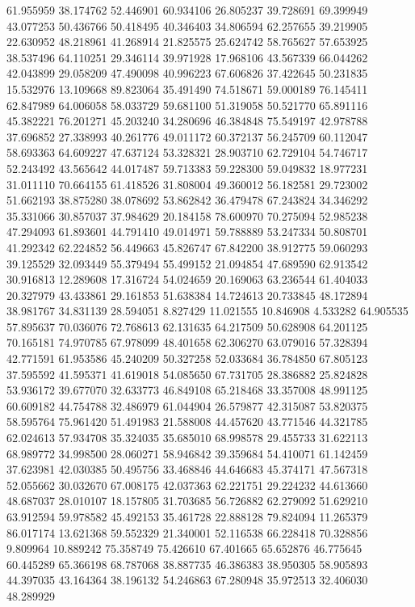61.955959
38.174762
52.446901
60.934106
26.805237
39.728691
69.399949
43.077253
50.436766
50.418495
40.346403
34.806594
62.257655
39.219905
22.630952
48.218961
41.268914
21.825575
25.624742
58.765627
57.653925
38.537496
64.110251
29.346114
39.971928
17.968106
43.567339
66.044262
42.043899
29.058209
47.490098
40.996223
67.606826
37.422645
50.231835
15.532976
13.109668
89.823064
35.491490
74.518671
59.000189
76.145411
62.847989
64.006058
58.033729
59.681100
51.319058
50.521770
65.891116
45.382221
76.201271
45.203240
34.280696
46.384848
75.549197
42.978788
37.696852
27.338993
40.261776
49.011172
60.372137
56.245709
60.112047
58.693363
64.609227
47.637124
53.328321
28.903710
62.729104
54.746717
52.243492
43.565642
44.017487
59.713383
59.228300
59.049832
18.977231
31.011110
70.664155
61.418526
31.808004
49.360012
56.182581
29.723002
51.662193
38.875280
38.078692
53.862842
36.479478
67.243824
34.346292
35.331066
30.857037
37.984629
20.184158
78.600970
70.275094
52.985238
47.294093
61.893601
44.791410
49.014971
59.788889
53.247334
50.808701
41.292342
62.224852
56.449663
45.826747
67.842200
38.912775
59.060293
39.125529
32.093449
55.379494
55.499152
21.094854
47.689590
62.913542
30.916813
12.289608
17.316724
54.024659
20.169063
63.236544
61.404033
20.327979
43.433861
29.161853
51.638384
14.724613
20.733845
48.172894
38.981767
34.831139
28.594051
8.827429
11.021555
10.846908
4.533282
64.905535
57.895637
70.036076
72.768613
62.131635
64.217509
50.628908
64.201125
70.165181
74.970785
67.978099
48.401658
62.306270
63.079016
57.328394
42.771591
61.953586
45.240209
50.327258
52.033684
36.784850
67.805123
37.595592
41.595371
41.619018
54.085650
67.731705
28.386882
25.824828
53.936172
39.677070
32.633773
46.849108
65.218468
33.357008
48.991125
60.609182
44.754788
32.486979
61.044904
26.579877
42.315087
53.820375
58.595764
75.961420
51.491983
21.588008
44.457620
43.771546
44.321785
62.024613
57.934708
35.324035
35.685010
68.998578
29.455733
31.622113
68.989772
34.998500
28.060271
58.946842
39.359684
54.410071
61.142459
37.623981
42.030385
50.495756
33.468846
44.646683
45.374171
47.567318
52.055662
30.032670
67.008175
42.037363
62.221751
29.224232
44.613660
48.687037
28.010107
18.157805
31.703685
56.726882
62.279092
51.629210
63.912594
59.978582
45.492153
35.461728
22.888128
79.824094
11.265379
86.017174
13.621368
59.552329
21.340001
52.116538
66.228418
70.328856
9.809964
10.889242
75.358749
75.426610
67.401665
65.652876
46.775645
60.445289
65.366198
68.787068
38.887735
46.386383
38.950305
58.905893
44.397035
43.164364
38.196132
54.246863
67.280948
35.972513
32.406030
48.289929
